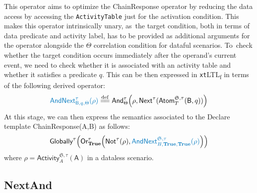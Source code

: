 \documentclass[information,article,accept,pdftex,oneauthor]{Definitions/mdpi}
\newcommand{\eqdef}{\overset{\mathrm{def}}{=\joinrel=}}
\newcommand{\LOG}{\ensuremath{\mathfrak{S}}}
\begin{document}
This operator aims to optimize the \textsf{ChainResponse} operator by reducing the data access by accessing the \texttt{ActivityTable} just for the activation condition. This makes this operator intrinsically unary, as~the target condition, both in terms of data predicate and activity label, has to be provided as additional arguments for the operator alongside the $\Theta$ correlation condition for dataful scenarios. To~check whether the target condition occurs immediately after the operand's current event, we need to check whether it is associated with an activity table and whether it satisfies a predicate $q$. This can be then expressed in \texttt{xt}LTL\textsubscript{f} in terms of the following derived operator:
\begin{equation}\label{eq:andNext}
{\color{oceanboatblue}\textsf{AndNext}^\tau_{\textsf{B},q,\Theta}(\rho)}\eqdef\textsf{And}^\tau_\Theta\left(\rho,\textsf{Next}^\tau(\textsf{Atom}^{\LOG,\tau}_{T}(\textsf{B},q))\right)
\end{equation}
At this stage, we can then express the semantics associated to the Declare template \textsf{ChainResponse(A,B)} as follows:
\begin{equation}\label{qp3}
    \textsf{Globally}^\tau\left(\textsf{Or}^\tau_\textbf{True}\left(\textsf{Not}^\tau(\rho),{\color{oceanboatblue}\textsf{AndNext}^{\LOG,\tau}_{B,\textbf{True},\textbf{True}}(\rho)}\right)\right)
\end{equation}
where $\rho=\textsf{Activity}^{\LOG,\tau}_A(\textsf{A})$ in a dataless scenario.



\subsection{NextAnd} 
\end{document}
